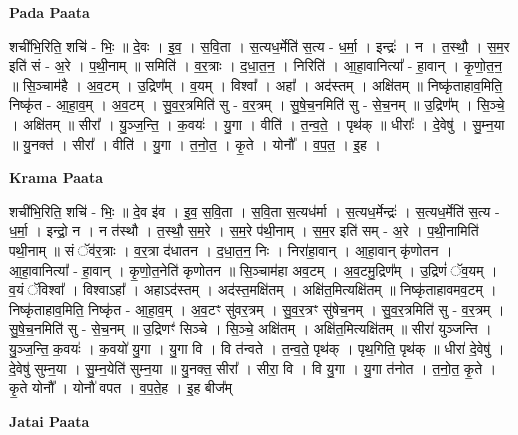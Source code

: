 \documentclass[17pt]{extarticle}
\begin{document}
\textbf{Pada Paata} \newline

शची॑भि॒रिति॒ शचि॑ - भिः॒ ॥ दे॒वः । इ॒व॒ । स॒वि॒ता । स॒त्यध॒र्मेति॑ स॒त्य - ध॒र्मा॒ । इन्द्रः॑ । न । त॒स्थौ॒ । स॒म॒र इति॑ सं - अ॒रे । प॒थी॒नाम् ॥ समिति॑ । व॒र॒त्राः । द॒धा॒त॒न॒ । निरिति॑ । आ॒हा॒वानित्या᳚ - हा॒वान् । कृ॒णो॒त॒न॒ ॥ सि॒ञ्चाम॑है । अ॒व॒टम् । उ॒द्रिण᳚म् । व॒यम् । विश्वा᳚ । अहा᳚ । अद॑स्तम् । अक्षि॑तम् ॥ निष्कृ॑ताहाव॒मिति॒ निष्कृ॑त - आ॒हा॒व॒म् । अ॒व॒टम् । सु॒व॒र॒त्रमिति॑ सु - व॒र॒त्रम् । सु॒षे॒च॒नमिति॑ सु - से॒च॒नम् ॥ उ॒द्रिण᳚म् । सि॒ञ्चे॒ । अक्षि॑तम् ॥ सीरा᳚ । यु॒ञ्ज॒न्ति॒ । क॒वयः॑ । यु॒गा । वीति॑ । त॒न्व॒ते॒ । पृथ॑क् ॥ धीराः᳚ । दे॒वेषु॑ । सु॒म्न॒या ॥ यु॒नक्त॑ । सीरा᳚ । वीति॑ । यु॒गा । त॒नो॒त॒ । कृ॒ते । योनौ᳚ । व॒प॒त॒ । इ॒ह ।  \newline


\textbf{Krama Paata} \newline

शची॑भि॒रिति॒ शचि॑ - भिः॒ ॥ दे॒व इ॑व । इ॒व॒ स॒वि॒ता । स॒वि॒ता स॒त्यध॑र्मा । स॒त्यध॒र्मेन्द्रः॑ । स॒त्यध॒र्मेति॑ स॒त्य - ध॒र्मा॒ । इन्द्रो॒ न । न त॑स्थौ । त॒स्थौ॒ स॒म॒रे । स॒म॒रे प॑थी॒नाम् । स॒म॒र इति॑ सम् - अ॒रे । प॒थी॒नामिति॑ पथी॒नाम् ॥ सं ॅव॑र॒त्राः । व॒र॒त्रा द॑धातन । द॒धा॒त॒न॒ निः । निरा॑हा॒वान् । आ॒हा॒वान् कृ॑णोतन । आ॒हा॒वानित्या᳚ - हा॒वान् । कृ॒णो॒त॒नेति॑ कृणोतन ॥ सि॒ञ्चाम॑हा अव॒टम् । अ॒व॒टमु॒द्रिण᳚म् । उ॒द्रिणं॑ ॅव॒यम् । व॒यं ॅविश्वा᳚ । विश्वाऽहा᳚ । अहाऽद॑स्तम् । अद॑स्त॒मक्षि॑तम् । अक्षि॑त॒मित्यक्षि॑तम् ॥ निष्कृ॑ताहावमव॒टम् । निष्कृ॑ताहाव॒मिति॒ निष्कृ॑त - आ॒हा॒व॒म् । अ॒व॒टꣳ सु॑वर॒त्रम् । सु॒व॒र॒त्रꣳ सु॑षेच॒नम् । सु॒व॒र॒त्रमिति॑ सु - व॒र॒त्रम् । सु॒षे॒च॒नमिति॑ सु - से॒च॒नम् ॥ उ॒द्रिणꣳ॑ सिञ्चे । सि॒ञ्चे॒ अक्षि॑तम् । अक्षि॑त॒मित्यक्षि॑तम् ॥ सीरा॑ युञ्जन्ति । यु॒ञ्ज॒न्ति॒ क॒वयः॑ । क॒वयो॑ यु॒गा । यु॒गा वि । वि त॑न्वते । त॒न्व॒ते॒ पृथ॑क् । पृथ॒गिति॒ पृथ॑क् ॥ धीरा॑ दे॒वेषु॑ । दे॒वेषु॑ सुम्न॒या । सु॒म्न॒येति॑ सुम्न॒या ॥ यु॒नक्त॒ सीरा᳚ । सीरा॒ वि । वि यु॒गा । यु॒गा त॑नोत । त॒नो॒त॒ कृ॒ते । कृ॒ते योनौ᳚ । योनौ॑ वपत । व॒प॒ते॒ह । 
इ॒ह बीज᳚म् \newline

\textbf{Jatai Paata} \newline
\end{document}
